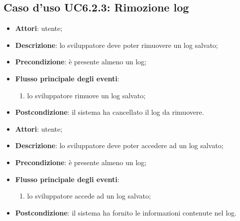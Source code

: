 \documentclass[../AnalisiDeiRequisiti.tex]{subfiles}
\begin{document}
\subsection{Caso d'uso UC6.2.3: Rimozione log}
\begin{itemize}
\item \textbf{Attori}: utente;
\item \textbf{Descrizione}: lo sviluppatore deve poter rimuovere un log salvato; 
      \item \textbf{Precondizione}: è presente almeno un log;

        \item \textbf{Flusso principale degli eventi}:
          \begin{enumerate}
          \item lo sviluppatore rimuove un log salvato;

      \end{enumerate}
    \item \textbf{Postcondizione}: il sistema ha cancellato il log da rimuovere.
  \end{itemize}
\hypertarget{UC6.2.4}{}
\begin{itemize}
\item \textbf{Attori}: utente;
\item \textbf{Descrizione}: lo sviluppatore deve poter accedere ad un log salvato; 
      \item \textbf{Precondizione}: è presente almeno un log;

        \item \textbf{Flusso principale degli eventi}:
          \begin{enumerate}
          \item lo sviluppatore accede ad un log salvato;

      \end{enumerate}
    \item \textbf{Postcondizione}: il sistema ha fornito le informazioni contenute nel log.
  \end{itemize}
\hypertarget{UC7}{}
\end{document}
